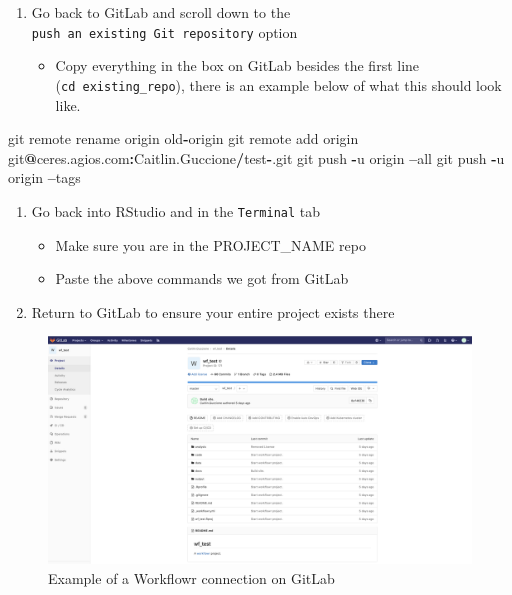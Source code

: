 \documentclass[openany]{article}
\newenvironment{Shaded}{\begin{snugshade}}{\end{snugshade}}
\newcommand{\NormalTok}[1]{#1}
\newcommand{\OperatorTok}[1]{\textcolor[rgb]{0.81,0.36,0.00}{\textbf{#1}}}
\providecommand{\tightlist}{%
  \setlength{\itemsep}{0pt}\setlength{\parskip}{0pt}}
\begin{document}
\begin{enumerate}
\def\labelenumi{\arabic{enumi}.}
\setcounter{enumi}{1}
\tightlist
\item
  Go back to GitLab and scroll down to the \texttt{push\ an\ existing\ Git\ repository} option

  \begin{itemize}
  \tightlist
  \item
    Copy everything in the box on GitLab besides the first line (\texttt{cd\ existing\_repo}), there is an example below of what this should look like.
  \end{itemize}
\end{enumerate}

\begin{Shaded}
\begin{Highlighting}[]
\NormalTok{git remote rename origin old}\OperatorTok{-}\NormalTok{origin}
\NormalTok{git remote add origin git}\OperatorTok{@}\NormalTok{ceres.agios.com}\OperatorTok{:}\NormalTok{Caitlin.Guccione}\OperatorTok{/}\NormalTok{test}\OperatorTok{-}\NormalTok{.git}
\NormalTok{git push }\OperatorTok{-}\NormalTok{u origin }\OperatorTok{--}\NormalTok{all}
\NormalTok{git push }\OperatorTok{-}\NormalTok{u origin }\OperatorTok{--}\NormalTok{tags}
\end{Highlighting}
\end{Shaded}

\begin{enumerate}
\def\labelenumi{\arabic{enumi}.}
\setcounter{enumi}{2}
\tightlist
\item
  Go back into RStudio and in the \texttt{Terminal} tab

  \begin{itemize}
  \tightlist
  \item
    Make sure you are in the PROJECT\_NAME repo
  \item
    Paste the above commands we got from GitLab
  \end{itemize}
\item
  Return to GitLab to ensure your entire project exists there
\end{enumerate}

\begin{figure}

{\centering \includegraphics[width=1\linewidth]{images/Workflow_Photos/screen_shot} 

}

\caption{Example of a Workflowr connection on GitLab}\label{fig:a3}
\end{figure}
\end{document}
